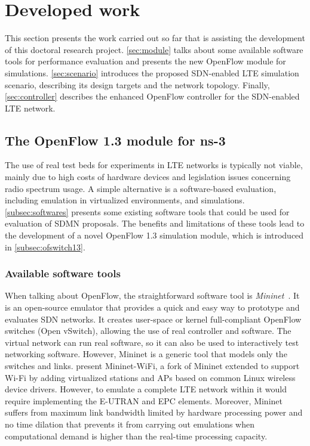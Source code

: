 \clearpage
\section{Developed work}
\label{ch:developed}

This section presents the work carried out so far that is assisting the
development of this doctoral research project. \autoref{sec:module} talks about
some available software tools for performance evaluation and presents the new
OpenFlow module for simulations. \autoref{sec:scenario} introduces the proposed
\ac{SDN}-enabled \ac{LTE} simulation scenario, describing its design targets
and the network topology. Finally, \autoref{sec:controller} describes the
enhanced OpenFlow controller for the \ac{SDN}-enabled \ac{LTE} network.


\subsection{The OpenFlow 1.3 module for \acs{ns-3}}
\label{sec:module}

The use of real test beds for experiments in \ac{LTE} networks is typically not
viable, mainly due to high costs of hardware devices and legislation issues
concerning radio spectrum usage. A simple alternative is a software-based
evaluation, including emulation in virtualized environments, and simulations.
\autoref{subsec:softwares} presents some existing software tools that could be
used for evaluation of \ac{SDMN} proposals. The benefits and limitations of
these tools lead to the development of a novel OpenFlow 1.3 simulation module,
which is introduced in \autoref{subsec:ofswitch13}.

\subsubsection{Available software tools}
\label{subsec:softwares}

When talking about OpenFlow, the straightforward software tool is
\emph{Mininet}~\cite{Mininet}. It is an open-source emulator that provides a
quick and easy way to prototype and evaluates \ac{SDN} networks. It creates
user-space or kernel full-compliant OpenFlow switches (Open vSwitch), allowing
the use of real controller and software. The virtual network can run real
software, so it can also be used to interactively test networking software.
However, Mininet is a generic tool that models only the switches and links.
\citet{Fontes2015} present Mininet-WiFi, a fork of Mininet extended to support
Wi-Fi by adding virtualized stations and \acp{AP} based on common Linux
wireless device drivers. However, to emulate a complete \ac{LTE} network within
it would require implementing the \ac{E-UTRAN} and \ac{EPC} elements. Moreover,
Mininet suffers from maximum link bandwidth limited by hardware processing
power and no time dilation that prevents it from carrying out emulations when
computational demand is higher than the real-time processing capacity.


